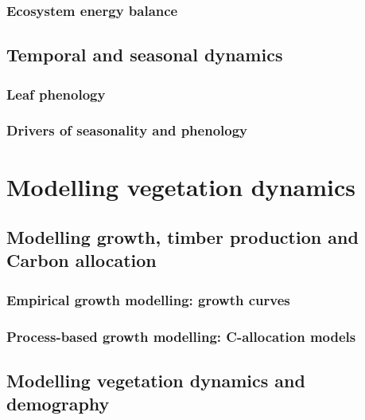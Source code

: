 \documentclass[oneside]{book}
\begin{document}
\section{Ecosystem energy balance}\label{ecosystem-energy-balance}

\chapter{Temporal and seasonal
dynamics}\label{temporal-and-seasonal-dynamics}


\section{Leaf phenology}\label{leaf-phenology}

\section{Drivers of seasonality and
phenology}\label{drivers-of-seasonality-and-phenology}

\part{Modelling vegetation
dynamics}\label{part-modelling-vegetation-dynamics}

\chapter{Modelling growth, timber production and Carbon
allocation}\label{modelling-growth-timber-production-and-carbon-allocation}


\section{Empirical growth modelling: growth
curves}\label{empirical-growth-modelling-growth-curves}

\section{Process-based growth modelling: C-allocation
models}\label{process-based-growth-modelling-c-allocation-models}

\chapter{Modelling vegetation dynamics and
demography}\label{modelling-vegetation-dynamics-and-demography}
\end{document}
